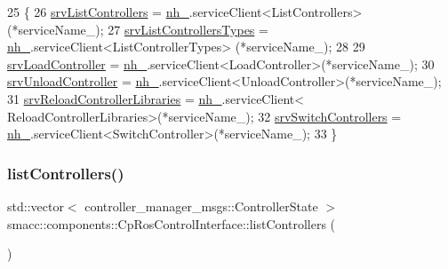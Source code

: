 \begin{DoxyCode}
25 \{
26     \hyperlink{classsmacc_1_1components_1_1CpRosControlInterface_aec2d2eb63ad4f04741493329e6c33696}{srvListControllers} = \hyperlink{classsmacc_1_1components_1_1CpRosControlInterface_a58b15bd11d13cb02813232c6e50adbd2}{nh\_}.serviceClient<ListControllers>(*serviceName\_);
27     \hyperlink{classsmacc_1_1components_1_1CpRosControlInterface_a5a4983fca48da646b5fc94ce1f0e4114}{srvListControllersTypes} = \hyperlink{classsmacc_1_1components_1_1CpRosControlInterface_a58b15bd11d13cb02813232c6e50adbd2}{nh\_}.serviceClient<ListControllerTypes>
      (*serviceName\_);
28 
29     \hyperlink{classsmacc_1_1components_1_1CpRosControlInterface_aa6c1440534d6a825644f0c3620461b72}{srvLoadController} = \hyperlink{classsmacc_1_1components_1_1CpRosControlInterface_a58b15bd11d13cb02813232c6e50adbd2}{nh\_}.serviceClient<LoadController>(*serviceName\_);
30     \hyperlink{classsmacc_1_1components_1_1CpRosControlInterface_a0515a2a86bfcd0fdec08fabd3070723c}{srvUnloadController} = \hyperlink{classsmacc_1_1components_1_1CpRosControlInterface_a58b15bd11d13cb02813232c6e50adbd2}{nh\_}.serviceClient<UnloadController>(*serviceName\_);
31     \hyperlink{classsmacc_1_1components_1_1CpRosControlInterface_afdfece75d6aa438fae728e72add50e16}{srvReloadControllerLibraries} = \hyperlink{classsmacc_1_1components_1_1CpRosControlInterface_a58b15bd11d13cb02813232c6e50adbd2}{nh\_}.serviceClient<
      ReloadControllerLibraries>(*serviceName\_);
32     \hyperlink{classsmacc_1_1components_1_1CpRosControlInterface_a78e45e68567c23ca5c19df0de257c20f}{srvSwitchControllers} = \hyperlink{classsmacc_1_1components_1_1CpRosControlInterface_a58b15bd11d13cb02813232c6e50adbd2}{nh\_}.serviceClient<SwitchController>(*serviceName\_);
33 \}
\end{DoxyCode}
\mbox{\label{classsmacc_1_1components_1_1CpRosControlInterface_ab5666d2b888f63fd6aeb1056ffec10cb}} 
\subsubsection{\texorpdfstring{list\+Controllers()}{listControllers()}}
{\footnotesize\ttfamily std\+::vector$<$ controller\+\_\+manager\+\_\+msgs\+::\+Controller\+State $>$ smacc\+::components\+::\+Cp\+Ros\+Control\+Interface\+::list\+Controllers (\begin{DoxyParamCaption}{ }\end{DoxyParamCaption})}



